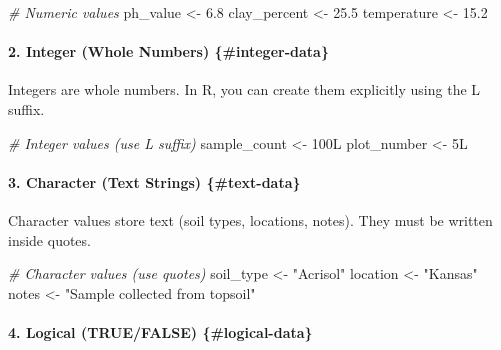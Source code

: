\documentclass[
  10pt,
  b5paper,
  oneside]{book}
\newenvironment{Shaded}{\begin{snugshade}}{\end{snugshade}}
\newcommand{\CommentTok}[1]{\textcolor[rgb]{0.56,0.35,0.01}{\textit{#1}}}
\newcommand{\DataTypeTok}[1]{\textcolor[rgb]{0.13,0.29,0.53}{#1}}
\newcommand{\DecValTok}[1]{\textcolor[rgb]{0.00,0.00,0.81}{#1}}
\newcommand{\FloatTok}[1]{\textcolor[rgb]{0.00,0.00,0.81}{#1}}
\newcommand{\NormalTok}[1]{#1}
\newcommand{\OtherTok}[1]{\textcolor[rgb]{0.56,0.35,0.01}{#1}}
\newcommand{\StringTok}[1]{\textcolor[rgb]{0.31,0.60,0.02}{#1}}
\begin{document}
\begin{Shaded}
\begin{Highlighting}[]
\CommentTok{\# Numeric values}
\NormalTok{ph\_value }\OtherTok{\textless{}{-}} \FloatTok{6.8}
\NormalTok{clay\_percent }\OtherTok{\textless{}{-}} \FloatTok{25.5}
\NormalTok{temperature }\OtherTok{\textless{}{-}} \FloatTok{15.2}
\end{Highlighting}
\end{Shaded}

\paragraph*{2. Integer (Whole Numbers) \{\#integer-data\}}\label{integer-whole-numbers-integer-data}

Integers are whole numbers. In R, you can create them explicitly using the L suffix.

\begin{Shaded}
\begin{Highlighting}[]
\CommentTok{\# Integer values (use L suffix)}
\NormalTok{sample\_count }\OtherTok{\textless{}{-}} \DecValTok{100}\DataTypeTok{L}
\NormalTok{plot\_number }\OtherTok{\textless{}{-}} \DecValTok{5}\DataTypeTok{L}
\end{Highlighting}
\end{Shaded}

\paragraph*{3. Character (Text Strings) \{\#text-data\}}\label{character-text-strings-text-data}

Character values store text (soil types, locations, notes). They must be written inside quotes.

\begin{Shaded}
\begin{Highlighting}[]
\CommentTok{\# Character values (use quotes)}
\NormalTok{soil\_type }\OtherTok{\textless{}{-}} \StringTok{"Acrisol"}
\NormalTok{location }\OtherTok{\textless{}{-}} \StringTok{"Kansas"}
\NormalTok{notes }\OtherTok{\textless{}{-}} \StringTok{"Sample collected from topsoil"}
\end{Highlighting}
\end{Shaded}

\paragraph*{4. Logical (TRUE/FALSE) \{\#logical-data\}}\label{logical-truefalse-logical-data}
\end{document}
